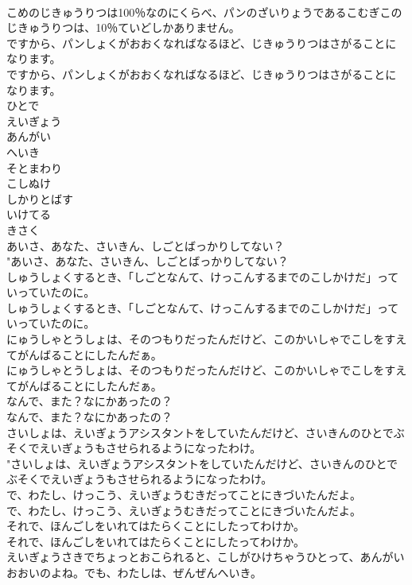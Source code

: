 \documentclass[8pt]{extreport}
\begin{document}
\begin{CJK}{UTF8}{min}
\\	こめのじきゅうりつは100％なのにくらべ、パンのざいりょうであるこむぎこのじきゅうりつは、10％ていどしかありません。 
\\	ですから、パンしょくがおおくなればなるほど、じきゅうりつはさがることになります。	
\\	ですから、パンしょくがおおくなればなるほど、じきゅうりつはさがることになります。 
\\	ひとで
\\	えいぎょう
\\	あんがい
\\	へいき
\\	そとまわり
\\	こしぬけ
\\	しかりとばす
\\	いけてる
\\	きさく
\\	あいさ、あなた、さいきん、しごとばっかりしてない？	
\\	"あいさ、あなた、さいきん、しごとばっかりしてない？ 
\\	しゅうしょくするとき、「しごとなんて、けっこんするまでのこしかけだ」っていっていたのに。	
\\	しゅうしょくするとき、「しごとなんて、けっこんするまでのこしかけだ」っていっていたのに。 
\\	にゅうしゃとうしょは、そのつもりだったんだけど、このかいしゃでこしをすえてがんばることにしたんだぁ。	
\\	にゅうしゃとうしょは、そのつもりだったんだけど、このかいしゃでこしをすえてがんばることにしたんだぁ。 
\\	なんで、また？なにかあったの？	
\\	なんで、また？なにかあったの？ 
\\	さいしょは、えいぎょうアシスタントをしていたんだけど、さいきんのひとでぶそくでえいぎょうもさせられるようになったわけ。	
\\	"さいしょは、えいぎょうアシスタントをしていたんだけど、さいきんのひとでぶそくでえいぎょうもさせられるようになったわけ。 
\\	で、わたし、けっこう、えいぎょうむきだってことにきづいたんだよ。	
\\	で、わたし、けっこう、えいぎょうむきだってことにきづいたんだよ。 
\\	それで、ほんごしをいれてはたらくことにしたってわけか。	
\\	それで、ほんごしをいれてはたらくことにしたってわけか。 
\\	えいぎょうさきでちょっとおこられると、こしがひけちゃうひとって、あんがいおおいのよね。でも、わたしは、ぜんぜんへいき。	

\end{CJK}
\end{document}
